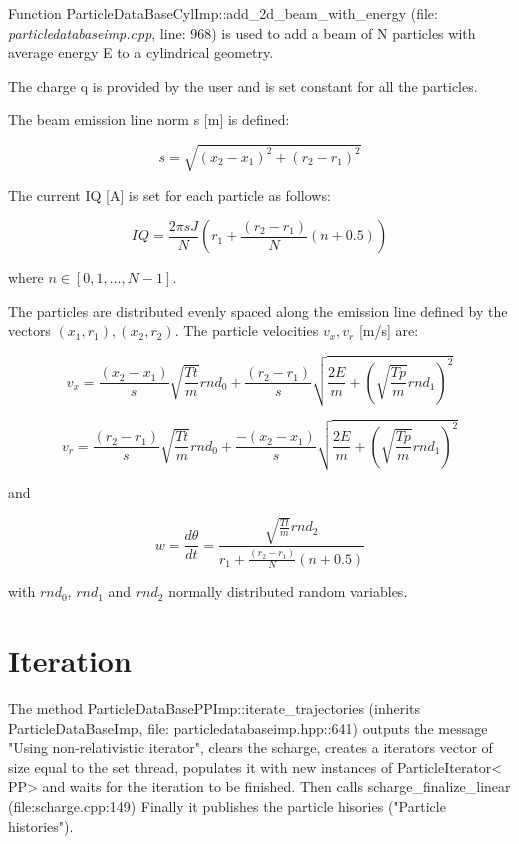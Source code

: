 \documentclass[12pt,a4paper]{article}
\begin{document}
Function ParticleDataBaseCylImp::add\_2d\_beam\_with\_energy (file: \textit{particledatabaseimp.cpp}, line: 968) is used to add a beam of N particles with average energy E to a cylindrical geometry.

The charge q is provided by the user and is set constant for all the particles.

The beam emission line norm s [m] is defined:

\begin{equation}
	s = \sqrt{(x_{2}-x_{1})^2+(r_{2}-r_{1})^2}
\end{equation}

The current IQ [A] is set for each particle as follows:

\begin{equation}
	IQ =\frac{2\pi sJ}{N}(r_{1} + \frac{(r_{2}-r_{1})}{N}(n+0.5))
\end{equation}

where $n\in[0,1,...,N-1]$. 

The particles are distributed evenly spaced along the emission line defined by the vectors $(x_{1},r_{1}), (x_{2},r_{2})$. The particle velocities $v_{x},v_{r}$ [m/s] are:

\begin{equation}
	v_{x}=\frac{(x_{2}-x_{1})}{s}\sqrt{\frac{Tt}{m}}rnd_{0}+\frac{(r_{2}-r_{1})}{s}\sqrt{\frac{2E}{m}+(\sqrt{\frac{Tp}{m}}rnd_{1})^2}
\end{equation}

\begin{equation}
	v_{r}=\frac{(r_{2}-r_{1})}{s}\sqrt{\frac{Tt}{m}}rnd_{0}+\frac{-(x_{2}-x_{1})}{s}\sqrt{\frac{2E}{m}+(\sqrt{\frac{Tp}{m}}rnd_{1})^2} 
\end{equation}

and

\begin{equation}
	w=\frac{d\theta}{dt}=\frac{\sqrt{\frac{Tt}{m}}rnd_{2}}{r_{1} + \frac{(r_{2}-r_{1})}{N}(n+0.5)}
\end{equation}

with $rnd_{0}$, $rnd_{1}$ and $rnd_{2}$ normally distributed random variables.


\section{Iteration}

The method ParticleDataBasePPImp::iterate\_trajectories (inherits ParticleDataBaseImp, file: particledatabaseimp.hpp::641) outputs the message "Using non-relativistic iterator", clears the scharge, creates a iterators vector of size equal to the set thread, populates it with new instances of ParticleIterator<  PP>  and waits for the iteration to be finished. Then calls scharge\_finalize\_linear (file:scharge.cpp:149) Finally it publishes the particle hisories ("Particle histories").
\end{document}
